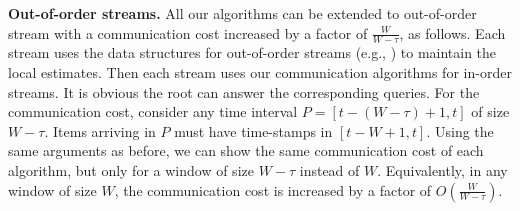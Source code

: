 \documentclass[proceedings]{stacs}
\theoremstyle{definition}\newtheorem{fact}{Fact}
\begin{document}
\vspace{.5ex}
{\bf Out-of-order streams.}
All our algorithms
can be extended to out-of-order stream with a communication cost increased
by a factor of $\frac{W}{W-\tau}$, as follows.
Each stream uses the data structures for out-of-order streams
(e.g., \cite{BuschT07,CormodeKT08}) to maintain the local estimates.
Then each stream uses our communication algorithms for in-order streams.
It is obvious the root
can answer the corresponding queries.
For the communication cost,
consider any time interval $P = [t - (W - \tau) + 1, t]$ of size $W-\tau$.
Items arriving in $P$ must have time-stamps in $[t-W+1, t]$.
Using the same arguments as before, we can show
the same communication cost of each algorithm,
but only for a window of size $W-\tau$ instead of $W$.
Equivalently, in any window of size $W$,
the communication cost is increased by a factor of $O(\frac{W}{W-\tau})$.
\end{document}
